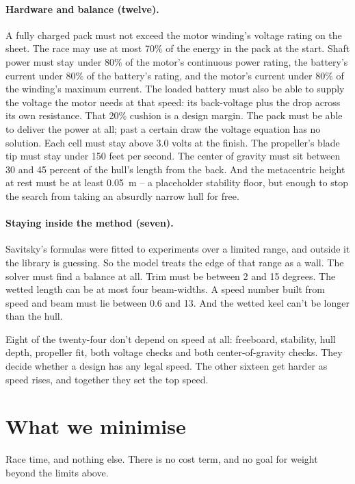 \documentclass[11pt,a4paper]{article}
\renewcommand{\_}{\textunderscore\allowbreak}
\begin{document}
\paragraph{Hardware and balance (twelve).} A fully charged pack must not exceed the motor winding's voltage rating on the sheet. The race may use at most 70\% of the energy in the pack at the start. Shaft power must stay under 80\% of the motor's continuous power rating, the battery's current under 80\% of the battery's rating, and the motor's current under 80\% of the winding's maximum current. The loaded battery must also be able to supply the voltage the motor needs at that speed: its back-voltage plus the drop across its own resistance. That 20\% cushion is a design margin. The pack must be able to deliver the power at all; past a certain draw the voltage equation has no solution.
Each cell must stay above 3.0 volts at the finish. The propeller's blade tip must stay under 150 feet per second. The center of gravity must sit between 30 and 45 percent of the hull's length from the back. And the metacentric height at rest must be at least 0.05~m -- a placeholder stability floor, but enough to stop the search from taking an absurdly narrow hull for free.

\paragraph{Staying inside the method (seven).} Savitsky's formulas were fitted to experiments over a limited range, and outside it the library is guessing. So the model treats the edge of that range as a wall.
The solver must find a balance at all. Trim must be between 2 and 15 degrees. The wetted length can be at most four beam-widths. A speed number built from speed and beam must lie between 0.6 and 13.
And the wetted keel can't be longer than the hull.

Eight of the twenty-four don't depend on speed at all: freeboard, stability, hull depth, propeller fit, both voltage checks and both center-of-gravity checks. They decide whether a design has any legal speed.
The other sixteen get harder as speed rises, and together they set the top speed.

\section*{What we minimise}
\label{sec:objective}

Race time, and nothing else. There is no cost term, and no goal for weight beyond the limits above.
\end{document}
